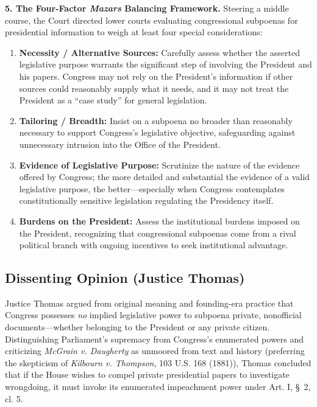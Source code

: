 \documentclass[12pt]{article}
\begin{document}
\textbf{5. The Four-Factor \textit{Mazars} Balancing Framework.} Steering a middle course, the Court directed lower courts evaluating congressional subpoenas for presidential information to weigh at least four special considerations:
\begin{enumerate}
  \item \textbf{Necessity / Alternative Sources:} Carefully assess whether the asserted legislative purpose warrants the significant step of involving the President and his papers. Congress may not rely on the President's information if other sources could reasonably supply what it needs, and it may not treat the President as a ``case study'' for general legislation.
  \item \textbf{Tailoring / Breadth:} Insist on a subpoena no broader than reasonably necessary to support Congress's legislative objective, safeguarding against unnecessary intrusion into the Office of the President.
  \item \textbf{Evidence of Legislative Purpose:} Scrutinize the nature of the evidence offered by Congress; the more detailed and substantial the evidence of a valid legislative purpose, the better---especially when Congress contemplates constitutionally sensitive legislation regulating the Presidency itself.
  \item \textbf{Burdens on the President:} Assess the institutional burdens imposed on the President, recognizing that congressional subpoenas come from a rival political branch with ongoing incentives to seek institutional advantage.
\end{enumerate}

\subsection{Dissenting Opinion (Justice Thomas)}

Justice Thomas argued from original meaning and founding-era practice that Congress possesses \textit{no} implied legislative power to subpoena private, nonofficial documents---whether belonging to the President or any private citizen. Distinguishing Parliament's supremacy from Congress's enumerated powers and criticizing \textit{McGrain v. Daugherty} as unmoored from text and history (preferring the skepticism of \textit{Kilbourn v. Thompson}, 103 U.S. 168 (1881)), Thomas concluded that if the House wishes to compel private presidential papers to investigate wrongdoing, it must invoke its enumerated impeachment power under Art. I, \S~2, cl. 5.
\end{document}

